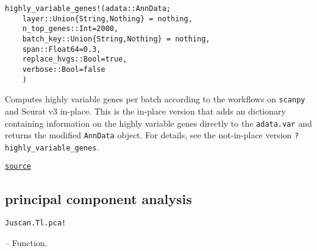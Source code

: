 \documentclass[oneside]{memoir}
\begin{document}
\begin{adjustwidth}{2em}{0pt}


\begin{verbatim}
highly_variable_genes!(adata::AnnData;
    layer::Union{String,Nothing} = nothing,
    n_top_genes::Int=2000,
    batch_key::Union{String,Nothing} = nothing,
    span::Float64=0.3,
    replace_hvgs::Bool=true,
    verbose::Bool=false
    )
\end{verbatim}

Computes highly variable genes per batch according to the workflows on \texttt{scanpy} and Seurat v3 in-place.  This is the in-place version that adds an dictionary containing information on the highly variable genes directly  to the \texttt{adata.var} and returns the modified \texttt{AnnData} object.  For details, see the not-in-place version \texttt{?highly\_variable\_genes}. 



\href{https://github.com/zehua0417/Juscan.jl/blob/393ad1b827b678ea98a738f92af658ee9ed9a403/src/tools/hvg.jl#L125-L139}{\texttt{source}}


\end{adjustwidth}

\subsection{principal component analysis}



\label{17408555383939503149}{}

\hypertarget{3699765327712641901}{\texttt{Juscan.Tl.pca!}}  -- {Function.}
\end{document}
